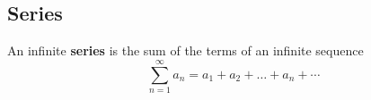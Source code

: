 \subsection{Series}
An infinite \textbf{series} is the sum of the terms of an infinite sequence
\[\sum_{n=1}^{\infty}a_n=a_1+a_2+\dots+a_n+\cdots\]